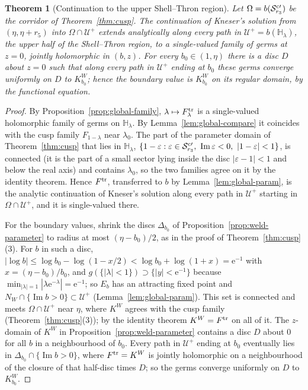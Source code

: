\documentclass[11pt]{amsart}
\newtheorem{theorem}{Theorem}[section]
\theoremstyle{definition}
\newcommand{\Kk}{K}
\newcommand{\eee}{\mathrm{e}}
\begin{document}
\begin{theorem}[Continuation to the upper Shell--Thron region]\label{thm:global}
Let $\Omega=b(\mathcal S^{\rm c\prime}_{r_3})$ be the corridor of Theorem~\ref{thm:cusp}.  The
continuation of Kneser's solution from $(\eta,\eta+r_5)$ into $\Omega\cap\mathcal U^+$ extends
analytically along every path in $\mathcal U^+=b(\mathbb H_\lambda)$, the upper half of the
Shell--Thron region, to a single-valued family of germs at $z=0$, jointly
holomorphic in $(b,z)$.  For every $b_0\in(1,\eta)$ there is a disc $D$ about
$z=0$ such that along every path in $\mathcal U^+$ ending at $b_0$ these germs
converge uniformly on $D$ to $\Kk^W_{b_0}$; hence the boundary value is $\Kk^W_{b_0}$ on
its regular domain, by the functional equation.
\end{theorem}

\begin{proof}
By Proposition~\ref{prop:global-family}, $\lambda\mapsto F^{\rm tr}_\lambda$ is a single-valued
holomorphic family of germs on $\mathbb H_\lambda$.  By Lemma~\ref{lem:global-compare} it
coincides with the cusp family $F_{1-\lambda}$ near $\lambda_0$.  The part of the
parameter domain of Theorem~\ref{thm:cusp} that lies in $\mathbb H_\lambda$,
$\{1-\varepsilon:\varepsilon\in\mathcal S^{\rm c\prime}_{r_3},\ \operatorname{Im}\varepsilon<0,\ |1-\varepsilon|<1\}$, is connected (it is the part
of a small sector lying inside the disc $|\varepsilon-1|<1$ and below the real axis) and contains $\lambda_0$, so the
two families agree on it by the identity theorem.  Hence $F^{\rm tr}$,
transferred to $b$ by Lemma~\ref{lem:global-param}, is the analytic
continuation of Kneser's solution along every path in $\mathcal U^+$ starting in
$\Omega\cap\mathcal U^+$, and it is single-valued there.

For the boundary values, shrink the discs $\Delta_{b_0}$ of
Proposition~\ref{prop:weld-parameter} to radius at most $(\eta-b_0)/2$, as in the
proof of Theorem~\ref{thm:cusp}(3).  For $b$ in such a disc,
$|\log b|\le\log b_0-\log(1-x/2)<\log b_0+\log(1+x)=\eee^{-1}$ with $x=(\eta-b_0)/b_0$,
and $g(\{|\lambda|<1\})\supset\{|y|<\eee^{-1}\}$ because $\min_{|\lambda|=1}|\lambda\eee^{-\lambda}|=\eee^{-1}$; so
$E_b$ has an attracting fixed point and $N_W\cap\{\operatorname{Im}b>0\}\subset\mathcal U^+$
(Lemma~\ref{lem:global-param}).  This set is connected and meets $\Omega\cap\mathcal U^+$
near $\eta$, where $\Kk^W$ agrees with the cusp family (Theorem~\ref{thm:cusp}(3));
by the identity theorem $\Kk^W=F^{\rm tr}$ on all of it.  The $z$-domain of $\Kk^W$
in Proposition~\ref{prop:weld-parameter} contains a disc $D$ about $0$ for all $b$
in a neighbourhood of $b_0$.  Every path in $\mathcal U^+$ ending at $b_0$ eventually lies
in $\Delta_{b_0}\cap\{\operatorname{Im}b>0\}$, where $F^{\rm tr}=\Kk^W$ is jointly holomorphic on a
neighbourhood of the closure of that half-disc times $D$; so the germs
converge uniformly on $D$ to $\Kk^W_{b_0}$.
\end{proof}
\end{document}
